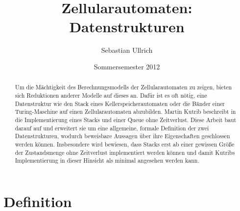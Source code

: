 \documentclass{article}
\title{Zellularautomaten: Datenstrukturen}
\author{Sebastian Ullrich}
\date{Sommersemester 2012}
\begin{document}
\newcommand{\ca}{\ensuremath\mathcal{A}}
\newcommand{\abs}[1]{\lvert#1\rvert}
\newcommand{\ceil}[1]{\lceil#1\rceil}
\newcommand{\zrange}[1]{\mathbb{G}_{#1}}
\newcommand{\bild}[1]{\text{Bild}(#1)}
\newcommand{\N}{\mathbb{N}}
\newcommand{\ve}[3]{\begin{pmatrix}#1\\#2\\#3\end{pmatrix}}

\newcommand{\pop}{\ensuremath{\mathit{pop}}}
\newcommand{\popZiel}{\ensuremath{\mathit{popZiel}}}
\newcommand{\popQuelle}{\ensuremath{\mathit{popQuelle}}}
\newcommand{\nop}{\ensuremath{\mathit{nop}}}
\newcommand{\push}{\ensuremath{\mathit{push}}}
\newcommand{\pushZiel}{\ensuremath{\mathit{pushZiel}}}
\newcommand{\pushQuelle}{\ensuremath{\mathit{pushQuelle}}}

\maketitle
\newpage

\begin{abstract}
    Um die Mächtigkeit des Berechnungsmodells der Zellularautomaten zu zeigen, bieten sich Reduktionen anderer Modelle auf dieses an. Dafür ist es oft nötig, eine Datenstruktur wie den Stack eines Kellerspeicherautomaten oder die Bänder einer Turing-Maschine auf einen Zellularautomaten abzubilden. Martin Kutrib beschreibt in \cite{kutrib08} die Implementierung eines Stacks und einer Queue ohne Zeitverlust. Diese Arbeit baut darauf auf und erweitert sie um eine allgemeine, formale Definition der zwei Datenstrukturen, wodurch beweisbare Aussagen über ihre Eigenschaften geschlossen werden können. Insbesondere wird bewiesen, dass Stacks erst ab einer gewissen Größe der Zustandsmenge ohne Zeitverlust implementiert werden können und damit Kutribs Implementierung in dieser Hinsicht als minimal angesehen werden kann.
\end{abstract}

\section{Definition}
\end{document}

